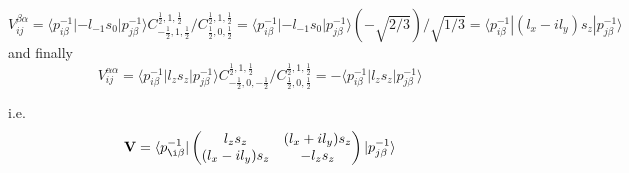 \documentclass{article}
\begin{document}
\begin{equation}
 V^{\beta\alpha}_{ij}  = \langle p_{i\beta}^{-1}|-l_{-1} s_{0} |p_{j\beta }^{-1}\rangle 
                         C^{\frac 1 2,1,\frac 1 2}_{-\frac 1 2,1,\frac 1 2}/
                         C^{\frac 1 2,1,\frac 1 2}_{\frac 1 2, 0,\frac 1 2}
                       = \langle p_{i\beta}^{-1}|-l_{-1} s_{0} |p_{j\beta }^{-1}\rangle (-\sqrt{2/3})/\sqrt{1/3}
                       = \langle p_{i\beta}^{-1}|(l_x-il_y) s_z |p_{j\beta }^{-1}\rangle
\end{equation}
and finally 
\begin{equation}
 V^{\alpha\alpha}_{ij}  =  \langle p_{i\beta}^{-1}|l_z s_z |p_{j\beta}^{-1}\rangle
                         C^{\frac 1 2,1,\frac 1 2}_{-\frac 1 2, 0,-\frac 1 2}/
                         C^{\frac 1 2,1,\frac 1 2}_{\frac 1 2, 0,\frac 1 2}
 = - \langle p_{i\beta}^{-1}|l_z s_z |p_{j\beta}^{-1}\rangle
\end{equation}

i.e.
\begin{equation}
 \mathbf{V}  =
    \langle 
        p_{\i\beta}^{-1}  |
         \begin{pmatrix} 
            l_z s_z &(l_x + i l_y)s_z \\
            (l_x-il_y)s_z & -l_z s_z
        \end{pmatrix}
        | p_{j\beta}^{-1}
    \rangle 
\end{equation}
\end{document}
